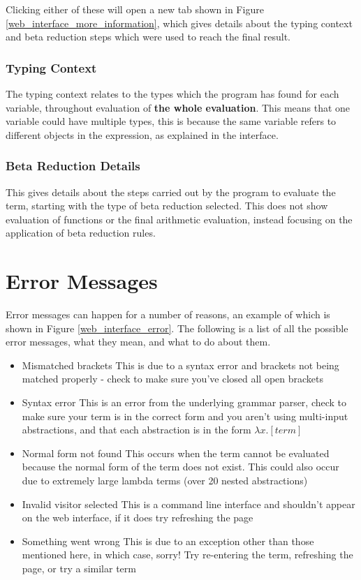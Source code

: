 \documentclass[a4paper,11pt]{article}
\begin{document}
Clicking either of these will open a new tab shown in Figure \ref{web_interface_more_information}, which gives details about the typing context and beta reduction steps which were used to reach the final result.

\subsubsection{Typing Context}

The typing context relates to the types which the program has found for each variable, throughout evaluation of \textbf{the whole evaluation}. This means that one variable could have multiple types, this is because the same variable refers to different objects in the expression, as explained in the interface.

\subsubsection{Beta Reduction Details}

This gives details about the steps carried out by the program to evaluate the term, starting with the type of beta reduction selected. This does not show evaluation of functions or the final arithmetic evaluation, instead focusing on the application of beta reduction rules.

\section{Error Messages}

Error messages can happen for a number of reasons, an example of which is shown in Figure \ref{web_interface_error}. The following is a list of all the possible error messages, what they mean, and what to do about them.

\begin{itemize}
	\item Mismatched brackets
	\subitem This is due to a syntax error and brackets not being matched properly - check to make sure you've closed all open brackets
	\item Syntax error
	\subitem This is an error from the underlying grammar parser, check to make sure your term is in the correct form and you aren't using multi-input abstractions, and that each abstraction is in the form $\lambda x.[term]$
	\item Normal form not found
	\subitem This occurs when the term cannot be evaluated because the normal form of the term does not exist. This could also occur due to extremely large lambda terms (over 20 nested abstractions)
	\item Invalid visitor selected
	\subitem This is a command line interface and shouldn't appear on the web interface, if it does try refreshing the page
	\item Something went wrong
	\subitem This is due to an exception other than those mentioned here, in which case, sorry! Try re-entering the term, refreshing the page, or try a similar term
\end{itemize}
\end{document}
